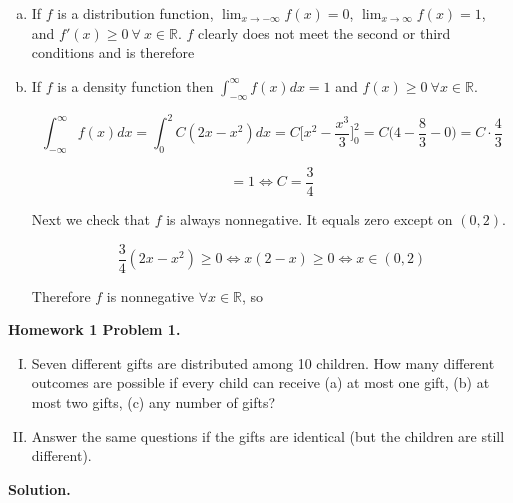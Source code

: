 \begin{enumerate}[(a)]

\item If \(f\) is a distribution function, \(\lim_{x \to -\infty} f(x) = 0\), \(\lim_{x \to \infty} f(x) = 1\), and \(f'(x) \geq 0 \ \forall \ x \in \mathbb{R}\). \(f\) clearly does not meet the second or third conditions and is therefore 

\item If \(f\) is a density function then \(\int_{-\infty}^{\infty} f(x) dx = 1\) and \(f(x) \geq 0 \ \forall x \in \mathbb{R}\). 

\[
\int_{-\infty}^{\infty} f(x) dx = \int_{0}^2 C(2x - x^2) dx = C \bigg[ x^2 - \frac{x^3}{3}\bigg]_0^2 = C \bigg( 4 - \frac{8}{3} - 0\bigg) = C \cdot \frac{4}{3} 
\]

\[
= 1 \iff C = \frac{3}{4}
\]

Next we check that \(f\) is always nonnegative. It equals zero except on \((0, 2)\). 

\[
\frac{3}{4}(2x -  x^2) \geq 0 \iff x(2 - x) \geq 0 \iff x \in (0, 2)
\]

Therefore \(f\) is nonnegative \(\forall x \in \mathbb{R}\), so 

\end{enumerate}


\textbf{Homework 1 Problem 1.} 

\begin{enumerate}[(I)]

\item Seven different gifts are distributed among 10 children. How many different outcomes are possible if every child can receive (a) at most one gift, (b) at most two gifts, (c) any number of gifts?

\item Answer the same questions if the gifts are identical (but the children are still different).

\end{enumerate}

\textbf{Solution.} 

